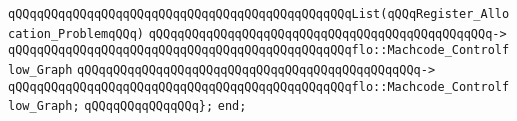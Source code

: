 \verb|qQQqqQQqqQQqqQQqqQQqqQQqqQQqqQQqqQQqqQQqqQQqqQQqList(qQQqRegister_Allocation_ProblemqQQq)|\newline
\verb|qQQqqQQqqQQqqQQqqQQqqQQqqQQqqQQqqQQqqQQqqQQqqQQq->|\newline
\verb|qQQqqQQqqQQqqQQqqQQqqQQqqQQqqQQqqQQqqQQqqQQqqQQqflo::Machcode_Controlflow_Graph|\newline
\verb|qQQqqQQqqQQqqQQqqQQqqQQqqQQqqQQqqQQqqQQqqQQqqQQq->|\newline
\verb|qQQqqQQqqQQqqQQqqQQqqQQqqQQqqQQqqQQqqQQqqQQqqQQqflo::Machcode_Controlflow_Graph;|\newline
\newline
\verb|qQQqqQQqqQQqqQQq};|\newline
\verb|end;|\newline

